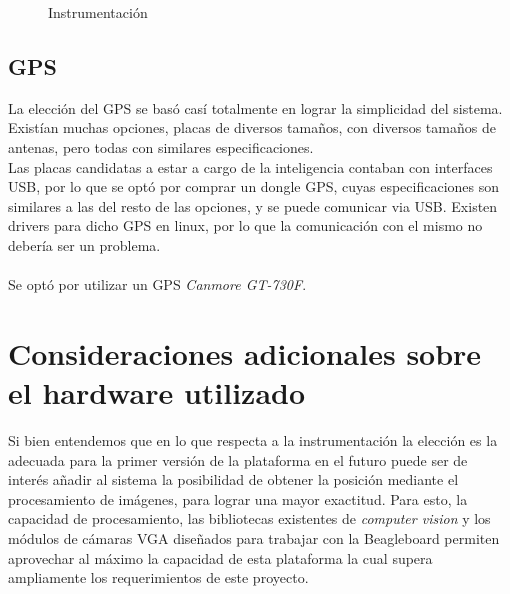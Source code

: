 \documentclass[main]{subfiles}
\begin{document}
\begin{figure} 
  \centering
  \hspace{2cm}
  
  \caption{Instrumentaci\'on}
  \label{fig:intrumentacion}
\end{figure}




\subsection{GPS}

La elecci\'on del GPS se bas\'o cas\'i totalmente en lograr la simplicidad del sistema. Exist\'ian muchas opciones, placas de diversos tama\~nos, con diversos tama\~nos de antenas, pero todas con similares especificaciones.\\

Las placas candidatas a estar a cargo de la inteligencia contaban con interfaces USB, por lo que se opt\'o por comprar un dongle GPS, cuyas especificaciones son similares a las del resto de las opciones, y se puede comunicar via USB. Existen drivers para dicho GPS en linux, por lo que la comunicaci\'on con el mismo no deber\'ia ser un problema.\\
\\
Se opt\'o por utilizar un GPS \textit{Canmore GT-730F}.

\section{Consideraciones adicionales sobre el hardware utilizado}

Si bien entendemos que en lo que respecta a la instrumentaci\'on la elecci\'on es la adecuada para la primer versi\'on de la plataforma en el futuro puede ser de inter\'es añadir al sistema la posibilidad de obtener la posici\'on mediante el procesamiento de im\'agenes, para lograr una mayor exactitud. Para esto, la capacidad de procesamiento, las bibliotecas existentes de \emph{computer vision} y los m\'odulos de c\'amaras VGA dise\~nados para trabajar con la Beagleboard permiten aprovechar al m\'aximo la capacidad de esta plataforma la cual supera ampliamente los requerimientos de este proyecto.\\

 
\end{document}
